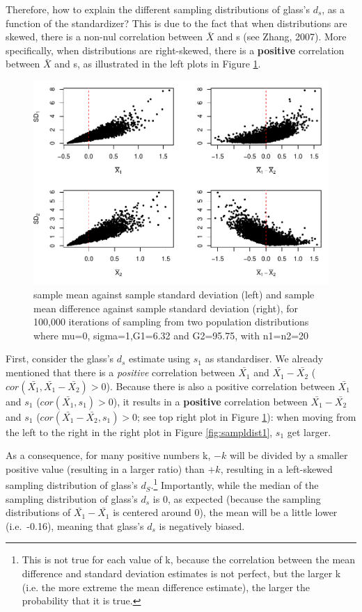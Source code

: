 \documentclass[
  man,floatsintext]{apa6}
\begin{document}
Therefore, how to explain the different sampling distributions of glass's \(d_s\), as a function of the standardizer? This is due to the fact that when distributions are skewed, there is a non-nul correlation between \(\bar{X}\) and s (see Zhang, 2007). More specifically, when distributions are right-skewed, there is a \textbf{positive} correlation between \(\bar{X}\) and s, as illustrated in the left plots in Figure \ref{fig:meanvssd1}.

\begin{figure}
\centering
\includegraphics{Mathematical-study-of-Glass-s-d_files/figure-latex/meanvssd1-1.pdf}
\caption{\label{fig:meanvssd1}sample mean against sample standard deviation (left) and sample mean difference against sample standard deviation (right), for 100,000 iterations of sampling from two population distributions where mu=0, sigma=1,G1=6.32 and G2=95.75, with n1=n2=20}
\end{figure}

First, consider the glass's \(d_s\) estimate using \(s_1\) as standardiser. We already mentioned that there is a \emph{positive} correlation between \(\bar{X_1}\) and \(\bar{X_1}-\bar{X_2}\) (\(cor(\bar{X_1},\bar{X_1}-\bar{X_2})>0\)). Because there is also a positive correlation between \(\bar{X_1}\) and \(s_1\) (\(cor(\bar{X_1},s_1)>0\)), it results in a \textbf{positive} correlation between \(\bar{X_1}-\bar{X_2}\) and \(s_1\) (\(cor(\bar{X_1}-\bar{X_2},s_1)>0\); see top right plot in Figure \ref{fig:meanvssd1}): when moving from the left to the right in the right plot in Figure \ref{fig:sampldist1}, \(s_1\) get larger.

As a consequence, for many positive numbers k, \(-k\) will be divided by a smaller positive value (resulting in a larger ratio) than \(+k\), resulting in a left-skewed sampling distribution of glass's \(d_S\).\footnote{This is not true for each value of k, because the correlation between the mean difference and standard deviation estimates is not perfect, but the larger k (i.e. the more extreme the mean difference estimate), the larger the probability that it is true.} Importantly, while the median of the sampling distribution of glass's \(d_s\) is 0, as expected (because the sampling distributions of \(\bar{X_1}-\bar{X_1}\) is centered around 0), the mean will be a little lower (i.e.~-0.16), meaning that glass's \(d_s\) is negatively biased.
\end{document}
